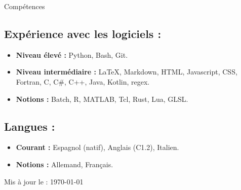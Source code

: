\begin{rSection}{Compétences}
    \vspace{\baselineskip}
    \subsection*{Expérience avec les logiciels :}
    \begin{itemize}
        \item \textbf{Niveau élevé :} Python, Bash, Git.
        \item \textbf{Niveau intermédiaire :} LaTeX, Markdown, HTML, Javascript, CSS, \\ Fortran, C, C\#, C++, Java, Kotlin, regex.
        \item \textbf{Notions :} Batch, R, MATLAB, Tcl, Rust, Lua, GLSL.
    \end{itemize}

    \subsection*{Langues :}
    \begin{itemize}
        \item \textbf{Courant :} Espagnol (natif), Anglais (C1.2), Italien.
        \item \textbf{Notions :} Allemand, Français.
    \end{itemize}
\end{rSection}

\begin{flushright} \small{Mis à jour le : \today} \end{flushright}


